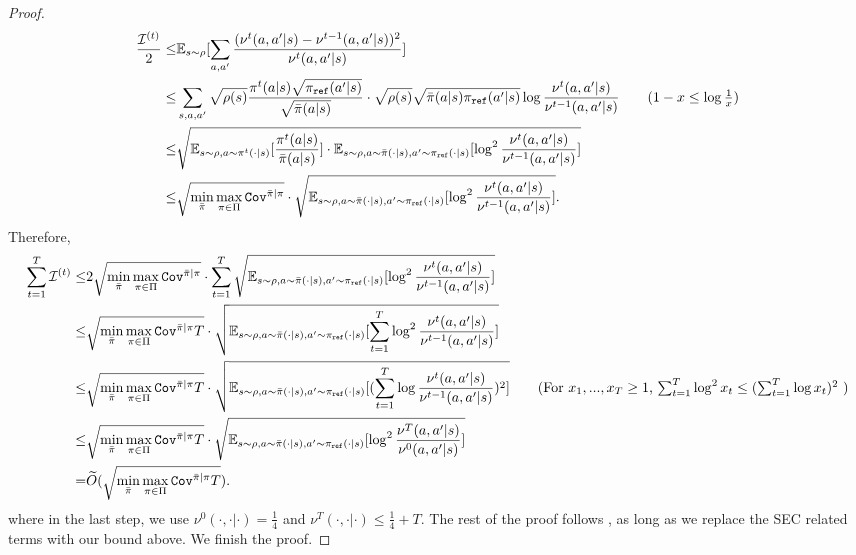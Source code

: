 \begin{proof}
    \begin{align*}
        \frac{\cI^{(t)}}{2} \leq & \EE_{s\sim\rho}[\sum_{a,a'} \frac{(\nu^t(a,a'|s) - \nu^{t-1}(a,a'|s))^2}{\nu^t(a,a'|s)}] \\
        \leq & \sum_{s,a,a'} \sqrt{\rho(s)}\frac{\pi^t(a|s)\sqrt{\pi_\textref(a'|s)}}{\sqrt{\bpi(a|s)}} \cdot \sqrt{\rho(s)}\sqrt{\bpi(a|s) \pi_\textref(a'|s)} \log \frac{\nu^t(a,a'|s)}{\nu^{t-1}(a,a'|s)} \tag{$1 - x \leq \log\frac{1}{x}$} \\
        \leq & \sqrt{\EE_{s\sim\rho,a\sim\pi^t(\cdot|s)}[\frac{\pi^t(a|s)}{\bpi(a|s)}] \cdot \EE_{s\sim\rho,a\sim\bpi(\cdot|s),a'\sim\pi_\textref(\cdot|s)}[\log^2 \frac{\nu^t(a,a'|s)}{\nu^{t-1}(a,a'|s)}]} \\
        \leq & \sqrt{\min_{\bpi} \max_{\pi \in \Pi} \cov^{\bpi|\pi}} \cdot \sqrt{\EE_{s\sim\rho,a\sim\bpi(\cdot|s),a'\sim\pi_\textref(\cdot|s)}[\log^2 \frac{\nu^t(a,a'|s)}{\nu^{t-1}(a,a'|s)}]}.
    \end{align*}
    Therefore,
    \begin{align*}
        \sum_{t=1}^T \cI^{(t)} \leq & 2 \sqrt{\min_{\bpi} \max_{\pi \in \Pi} \cov^{\bpi|\pi}} \cdot \sum_{t=1}^T \sqrt{\EE_{s\sim\rho,a\sim\bpi(\cdot|s),a'\sim\pi_\textref(\cdot|s)}[\log^2 \frac{\nu^t(a,a'|s)}{\nu^{t-1}(a,a'|s)}]} \\
        \leq & \sqrt{\min_{\bpi} \max_{\pi \in \Pi} \cov^{\bpi|\pi}T} \cdot \sqrt{\EE_{s\sim\rho,a\sim\bpi(\cdot|s),a'\sim\pi_\textref(\cdot|s)}[\sum_{t=1}^T \log^2 \frac{\nu^t(a,a'|s)}{\nu^{t-1}(a,a'|s)}]} \\
        \leq & \sqrt{\min_{\bpi} \max_{\pi \in \Pi} \cov^{\bpi|\pi}T} \cdot \sqrt{\EE_{s\sim\rho,a\sim\bpi(\cdot|s),a'\sim\pi_\textref(\cdot|s)}[(\sum_{t=1}^T \log \frac{\nu^t(a,a'|s)}{\nu^{t-1}(a,a'|s)})^2]} \tag{For $x_1,...,x_T \geq 1$, $\sum_{t=1}^T \log^2 x_t \leq (\sum_{t=1}^T \log x_t)^2$ } \\
        \leq & \sqrt{\min_{\bpi} \max_{\pi \in \Pi} \cov^{\bpi|\pi}T} \cdot \sqrt{\EE_{s\sim\rho,a\sim\bpi(\cdot|s),a'\sim\pi_\textref(\cdot|s)}[\log^2 \frac{\nu^T(a,a'|s)}{\nu^{0}(a,a'|s)}]} \\
        = & \tilde{O}(\sqrt{\min_{\bpi} \max_{\pi \in \Pi} \cov^{\bpi|\pi}T}).
    \end{align*}
    where in the last step, we use $\nu^0(\cdot,\cdot|\cdot) = \frac{1}{4}$ and $\nu^T(\cdot,\cdot|\cdot) \leq \frac{1}{4} + T$.
    The rest of the proof follows \citep{xie2024exploratory}, as long as we replace the SEC related terms with our bound above.
    We finish the proof.
\end{proof}


\fi